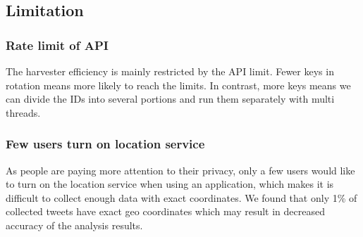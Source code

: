 \subsection{Limitation}
\subsubsection{Rate limit of API}

The harvester efficiency is mainly restricted by the API limit. Fewer keys in rotation means more likely to reach the limits. In contrast, more keys means we can divide the IDs into several portions and run them separately with multi threads. 

\subsubsection{Few users turn on location service}
As people are paying more attention to their privacy, only a few users would like to turn on the location service when using an application, which makes it is difficult to collect enough data with exact coordinates. We found that only 1\% of collected tweets have exact geo coordinates which may result in decreased accuracy of the analysis results.
